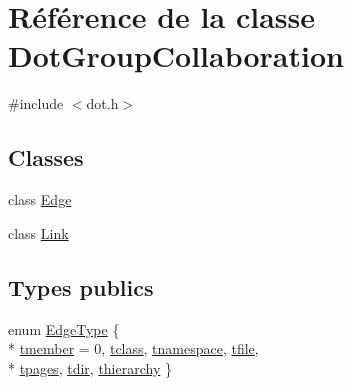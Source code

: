 \hypertarget{class_dot_group_collaboration}{}\section{Référence de la classe Dot\+Group\+Collaboration}
\label{class_dot_group_collaboration}


{\ttfamily \#include $<$dot.\+h$>$}

\subsection*{Classes}
\begin{DoxyCompactItemize}
\item 
class \hyperlink{class_dot_group_collaboration_1_1_edge}{Edge}
\item 
class \hyperlink{class_dot_group_collaboration_1_1_link}{Link}
\end{DoxyCompactItemize}
\subsection*{Types publics}
\begin{DoxyCompactItemize}
\item 
enum \hyperlink{class_dot_group_collaboration_ab83aa11b8617398a50923c04c2541624}{Edge\+Type} \{ \\*
\hyperlink{class_dot_group_collaboration_ab83aa11b8617398a50923c04c2541624a6a203a336e7cfcbd7aff57f2c73399cd}{tmember} = 0, 
\hyperlink{class_dot_group_collaboration_ab83aa11b8617398a50923c04c2541624ae9c350dfd0a91744d191b0c72c4aa90f}{tclass}, 
\hyperlink{class_dot_group_collaboration_ab83aa11b8617398a50923c04c2541624ae29bf2589c994b4a77c5d8fcb4cc0ea1}{tnamespace}, 
\hyperlink{class_dot_group_collaboration_ab83aa11b8617398a50923c04c2541624a7fa22c95ee2968afb94c0a0ea5699509}{tfile}, 
\\*
\hyperlink{class_dot_group_collaboration_ab83aa11b8617398a50923c04c2541624ad8208b1bd621d3b751e42e015d9ea21c}{tpages}, 
\hyperlink{class_dot_group_collaboration_ab83aa11b8617398a50923c04c2541624a2e54350e7f5aadd30f553c402c9c0a82}{tdir}, 
\hyperlink{class_dot_group_collaboration_ab83aa11b8617398a50923c04c2541624a6e085e15ff653f37b1923a3c3053d11b}{thierarchy}
 \}
\end{DoxyCompactItemize}
